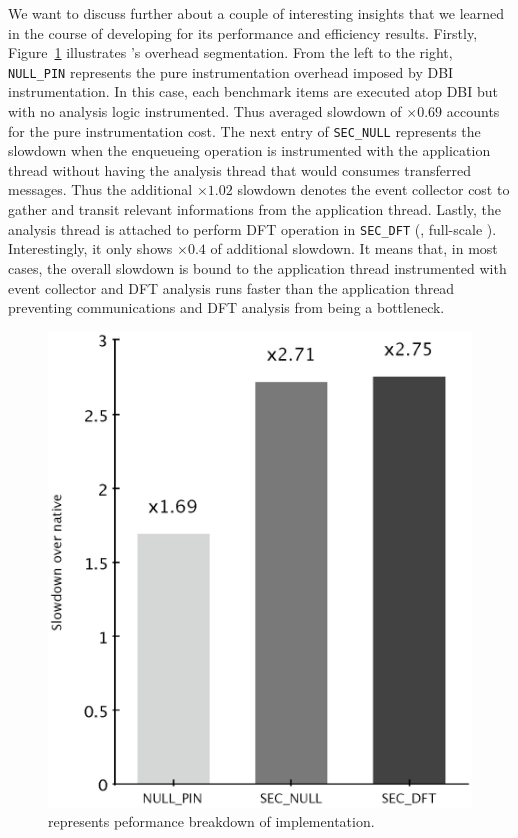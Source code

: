 We want to discuss further about a couple of interesting insights that we
learned in the course of developing \sreplica for its performance and
efficiency results. Firstly, Figure~\ref{fig:sreplica0} illustrates \sreplica's
overhead segmentation. From the left to the right, {\tt NULL\_PIN} represents
the pure instrumentation overhead imposed by DBI instrumentation. In this case,
each benchmark items are executed atop \pin DBI but with no analysis logic
instrumented.  Thus averaged slowdown of $\times 0.69$ accounts for the pure
instrumentation cost. The next entry of {\tt SEC\_NULL} represents the slowdown
when the enqueueing operation is instrumented with the application thread
without having the analysis thread that would consumes transferred messages.
Thus the additional $\times 1.02$ slowdown denotes the event collector cost to
gather and transit relevant informations from the application thread.  Lastly,
the analysis thread is attached to perform DFT operation in {\tt SEC\_DFT}
(\ie, full-scale \sreplica).  Interestingly, it only shows $\times 0.4$ of
additional slowdown. It means that, in most cases, the overall slowdown is
bound to the application thread instrumented with event collector and DFT
analysis runs faster than the application thread preventing communications and
DFT analysis from being a bottleneck.

\begin{figure}[tb]
    \centering
    \includegraphics[width=0.33\linewidth]{figs/sreplica0.eps}
    \caption{represents peformance breakdown of \sreplica implementation. \label{fig:sreplica0}}
\end{figure}

